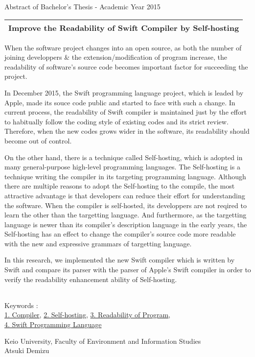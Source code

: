 Abstract of Bachelor's Thesis - Academic Year 2015
\begin{center}
\begin{Large}
\begin{tabular}{|c|} \hline
Improve the Readability of Swift Compiler by Self-hosting
\\
\hline
\end{tabular}
\end{Large}
\end{center}

When the software project changes into an open source, as both the number of joining developpers \& the extension/modification of program increase, the readability of software's source code becomes important factor for succeeding the project.

In December 2015, the Swift programming language project, which is leaded by Apple, made its souce code public and started to face with such a change.
In current process, the readability of Swift compiler is maintained just by the effort to habitually follow the coding style of existing codes and its strict review.
Therefore, when the new codes grows wider in the software, its readability should become out of control.

On the other hand, there is a technique called Self-hosting, which is adopted in many general-purpose high-level programming languages.
The Self-hosting is a technique writing the compiler in its targeting programming language.
Although there are multiple reasons to adopt the Self-hosting to the compile, the most attractive advantage is that developers can reduce their effort for understanding the software.
When the compiler is self-hosted, its developpers are not reqired to learn the other than the targetting language.
And furthermore, as the targetting language is newer than its compiler's description language in the early years, the Self-hosting has an effect to change the compiler's source code more readable with the new and expressive grammars of targetting language.

In this research, we implemented the new Swift compiler which is written by Swift and compare its parser with the parser of Apple's Swift compiler in order to verify the readability enhancement ability of Self-hosting.

~ \\
Keywords : \\
\underline{1. Compiler},
\underline{2. Self-hosting},
\underline{3. Readability of Program},\\
\underline{4. Swift Programming Language}
\begin{flushright}
Keio University, Faculty of Environment and Information Studies\\
Atsuki Demizu
\end{flushright}
